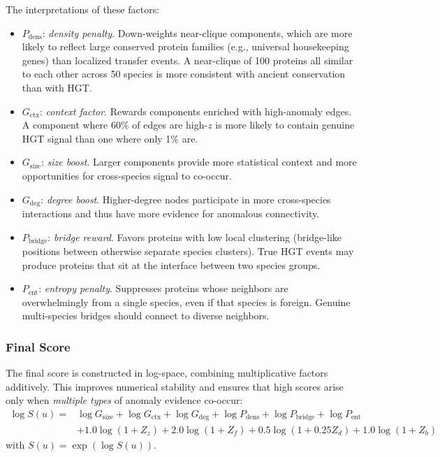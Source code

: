 \documentclass[11pt]{article}
\begin{document}
The interpretations of these factors:
\begin{itemize}[noitemsep]
    \item $P_{\mathrm{dens}}$: \textit{density penalty}. Down-weights near-clique components, which are more likely to reflect large conserved protein families (e.g., universal housekeeping genes) than localized transfer events. A near-clique of 100 proteins all similar to each other across 50 species is more consistent with ancient conservation than with HGT.
    \item $G_{\mathrm{ctx}}$: \textit{context factor}. Rewards components enriched with high-anomaly edges. A component where 60\% of edges are high-$z$ is more likely to contain genuine HGT signal than one where only 1\% are.
    \item $G_{\mathrm{size}}$: \textit{size boost}. Larger components provide more statistical context and more opportunities for cross-species signal to co-occur.
    \item $G_{\mathrm{deg}}$: \textit{degree boost}. Higher-degree nodes participate in more cross-species interactions and thus have more evidence for anomalous connectivity.
    \item $P_{\mathrm{bridge}}$: \textit{bridge reward}. Favors proteins with low local clustering (bridge-like positions between otherwise separate species clusters). True HGT events may produce proteins that sit at the interface between two species groups.
    \item $P_{\mathrm{ent}}$: \textit{entropy penalty}. Suppresses proteins whose neighbors are overwhelmingly from a single species, even if that species is foreign. Genuine multi-species bridges should connect to diverse neighbors.
\end{itemize}

\subsubsection{Final Score}
\label{subsubsec:finalscore}

The final score is constructed in log-space, combining multiplicative factors additively. This improves numerical stability and ensures that high scores arise only when \textit{multiple types} of anomaly evidence co-occur:
\begin{equation}
\begin{aligned}
\log S(u) = {}& \log G_{\mathrm{size}} + \log G_{\mathrm{ctx}} + \log G_{\mathrm{deg}}
+ \log P_{\mathrm{dens}} + \log P_{\mathrm{bridge}} + \log P_{\mathrm{ent}} \\
&+ 1.0\log(1 + Z_z) + 2.0\log(1 + Z_f) + 0.5\log(1 + 0.25 Z_d) + 1.0\log(1 + Z_b)
\end{aligned}
\end{equation}
with $S(u) = \exp(\log S(u))$.
\end{document}
